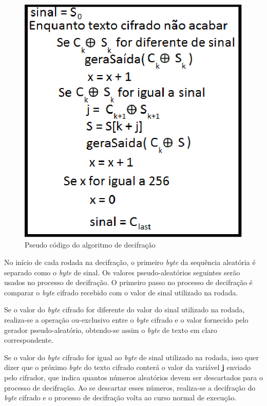 \begin{figure}[h]
	\centering
	\includegraphics[scale=1]{figuras/funcionamento_Decifra.eps}
	\caption{Pseudo código do algoritmo de decifração}
	\label{pseudo-codigo-decifrar}
\end{figure}

No início de cada rodada na decifração, o primeiro \textit{byte} da sequência aleatória é separado como o \textit{byte} de sinal. Os valores pseudo-aleatórios seguintes serão usados no processo de decifração. O primeiro passo no processo de decifração é comparar o \textit{byte} cifrado recebido com o valor de sinal utilizado na rodada. 

Se o valor do \textit{byte} cifrado for diferente do valor do sinal utilizado na rodada, realiza-se a operação ou-exclusivo entre o \textit{byte} cifrado e o valor fornecido pelo gerador pseudo-aleatório, obtendo-se assim o \textit{byte} de texto em claro correspondente.

Se o valor do \textit{byte} cifrado for igual ao \textit{byte} de sinal utilizado na rodada, isso quer dizer que o próximo \textit{byte} do texto cifrado conterá o valor da variável \textbf{j} enviado pelo cifrador, que indica quantos números aleatórios devem ser descartados para o processo de decifração. Ao se descartar esses números, realiza-se a decifração do \textit{byte} cifrado e o processo de decifração volta ao curso normal de execução.

